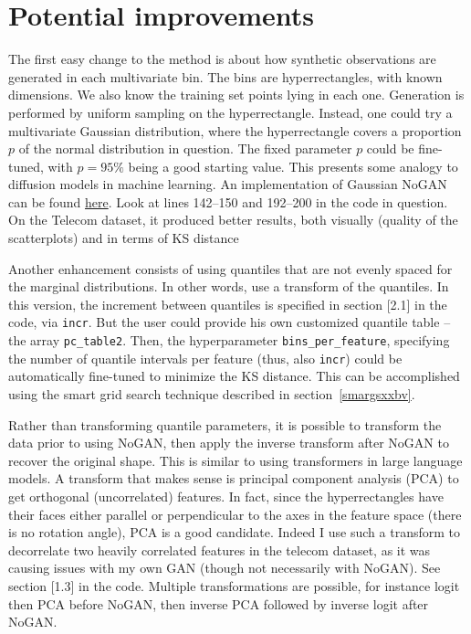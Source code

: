 \documentclass[oneside,10pt]{book}
\begin{document}
\section{Potential improvements}

The first easy change to the method is about how synthetic observations are generated in each multivariate bin. The bins are hyperrectangles, with known dimensions. We also know the training set points lying in each one. Generation is performed by uniform sampling on the hyperrectangle. Instead, one could try a multivariate Gaussian distribution, where the hyperrectangle covers a proportion $p$ of the normal distribution in question. The fixed parameter $p$ could be fine-tuned, with $p=95\%$ being a good starting value. This presents some analogy to 
 \textcolor{index}{diffusion models} in machine learning. An implementation of Gaussian NoGAN can
be found \href{https://github.com/VincentGranville/Main/blob/main/NoGAN_gaussian.py}{here}. Look at lines 142--150 and 192--200 in the code in question. On the Telecom dataset, it produced better results, both visually (quality of the scatterplots) and in terms of KS distance 

Another enhancement consists of using quantiles that are not evenly spaced for the marginal distributions. In other words, use a transform of the quantiles. In this version, the increment between quantiles is specified in section [2.1] in the code, via \texttt{incr}. 
But the user could provide his own customized quantile table -- the array \texttt{pc\_table2}. Then, the hyperparameter
 \texttt{bins\_per\_feature}, specifying the number of quantile intervals per feature (thus, also \texttt{incr}) could be automatically fine-tuned to minimize the KS distance. This can be accomplished using the 
\textcolor{index}{smart grid search}  technique described in section~\ref{smargsxxbv}.

Rather than transforming quantile parameters, it is possible to transform the data prior to using NoGAN, then apply the inverse transform
 after NoGAN to recover the original shape. This is similar to using \textcolor{index}{transformers} in large language models. A transform that makes sense is \textcolor{index}{principal component analysis} (PCA) to
 get orthogonal (uncorrelated) features. In fact, since the hyperrectangles have their faces either parallel or perpendicular to the axes in the feature space (there is no rotation angle), PCA is a good candidate. Indeed I use such a transform to decorrelate two heavily correlated features in the telecom dataset,
 as it was causing issues with my own GAN (though not necessarily with NoGAN). See section [1.3] in the code.
Multiple transformations are possible, for instance logit then PCA before NoGAN, then inverse PCA followed by inverse logit after NoGAN. 
\end{document}
